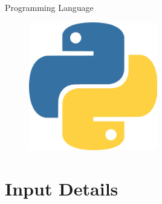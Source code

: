 \documentclass{beamer}
\begin{document}
\begin{frame}{Programming Language}
    \begin{minipage}[c]{0.4\textwidth}
        \begin{itemize}
        \end{itemize}
    \end{minipage}%
    \begin{minipage}[c]{0.6\textwidth}
        \begin{figure}[H]
            \centering
            \includegraphics[width=0.5\textwidth]{Images/python_logo.png}
        \end{figure}
    \end{minipage}
\end{frame}

\section{Input Details}
\end{document}
